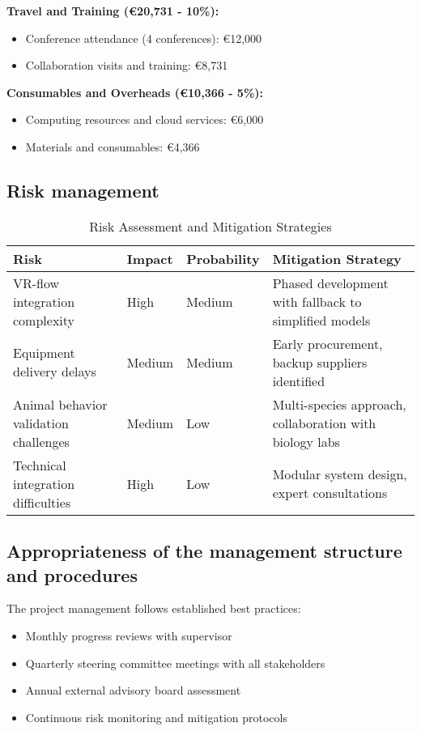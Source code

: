 \documentclass[11pt,a4paper]{article}
\newcommand{\highlight}[1]{\textbf{\color{blue!70!black} #1}}
\begin{document}
\highlight{Travel and Training (€20,731 - 10\%):}
\begin{itemize}[noitemsep]
\item Conference attendance (4 conferences): €12,000
\item Collaboration visits and training: €8,731
\end{itemize}

\highlight{Consumables and Overheads (€10,366 - 5\%):}
\begin{itemize}[noitemsep]
\item Computing resources and cloud services: €6,000
\item Materials and consumables: €4,366
\end{itemize}

\subsection{Risk management}

\begin{table}[h]
\centering
\caption{Risk Assessment and Mitigation Strategies}
\begin{tabular}{|p{3cm}|p{2cm}|p{5cm}|p{4cm}|}
\hline
\textbf{Risk} & \textbf{Impact} & \textbf{Probability} & \textbf{Mitigation Strategy} \\
\hline
VR-flow integration complexity & High & Medium & Phased development with fallback to simplified models \\
\hline
Equipment delivery delays & Medium & Medium & Early procurement, backup suppliers identified \\
\hline
Animal behavior validation challenges & Medium & Low & Multi-species approach, collaboration with biology labs \\
\hline
Technical integration difficulties & High & Low & Modular system design, expert consultations \\
\hline
\end{tabular}
\end{table}

\subsection{Appropriateness of the management structure and procedures}

The project management follows established best practices:
\begin{itemize}[noitemsep]
\item Monthly progress reviews with supervisor
\item Quarterly steering committee meetings with all stakeholders
\item Annual external advisory board assessment
\item Continuous risk monitoring and mitigation protocols
\end{itemize}
\end{document}
